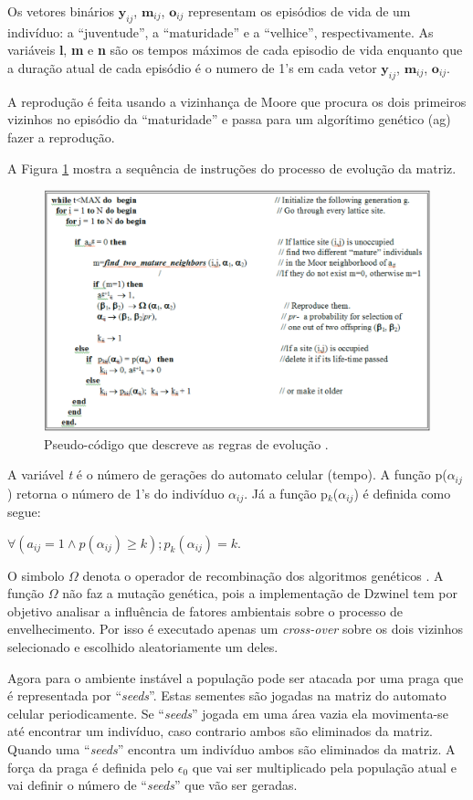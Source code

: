 \documentclass[12pt]{article}
\begin{document}
Os vetores binários $\textbf{y}_{ij}$, $\textbf{m}_{ij}$, $\textbf{o}_{ij}$
representam os episódios de vida de um indivíduo: a ``juventude'', a 
``maturidade'' e a ``velhice'', respectivamente. As variáveis \textbf{l},
\textbf{m} e \textbf{n} são os tempos máximos de cada episodio de vida
enquanto que a duração atual de cada episódio é o numero de 1's em cada vetor
$\textbf{y}_{ij}$, $\textbf{m}_{ij}$, $\textbf{o}_{ij}$.

A reprodução é feita usando a vizinhança de Moore que procura os dois
primeiros vizinhos no episódio da ``maturidade'' e passa para um algorítimo
genético (ag) fazer a reprodução.

A Figura \ref{fig:pseudo-codigo-evolucao} mostra a sequência de instruções
do processo de evolução da matriz. 

\begin{figure}[ht]
\centering
\includegraphics[width=.5\textwidth]{imagens/pseudo-codigo-evolucao.png}
\caption{Pseudo-código que descreve as regras de evolução \cite{dzwinel:04}.}
\label{fig:pseudo-codigo-evolucao}
\end{figure}

A variável \textit{t} é o número de gerações do automato celular (tempo). A
função p($\alpha _{ij}$) retorna o número de 1's do indivíduo
\textbf{$\alpha _{ij}$}. Já a função p$_{k}$($\alpha _{ij}$) é definida como
segue:

$\forall (a_{ij} = 1 \wedge p(\alpha _{ij}) \geq k); p_{k}(\alpha_{ij}) = k.$

O simbolo \textbf{$\Omega$} denota o operador de recombinação dos algoritmos
genéticos \cite{dzwinel:04}. A função \textbf{$\Omega$} não faz a mutação
genética, pois a implementação de Dzwinel tem por objetivo analisar a
influência de fatores ambientais sobre o processo de envelhecimento. Por isso
é executado apenas um \textit{cross-over} sobre os dois vizinhos selecionado e
escolhido aleatoriamente um deles.

Agora para o ambiente instável a população pode ser atacada por uma praga que
é representada por ``\textit{seeds}''. Estas sementes são jogadas na matriz do
automato celular periodicamente. Se ``\textit{seeds}'' jogada em uma área 
vazia ela movimenta-se até encontrar um indivíduo, caso contrario ambos são
eliminados da matriz. Quando uma ``\textit{seeds}'' encontra um indivíduo
ambos são eliminados da matriz. A força da praga é definida pelo
$\epsilon_{0}$ que vai ser multiplicado pela população atual e vai definir o
número de ``\textit{seeds}'' que vão ser geradas.
\end{document}
